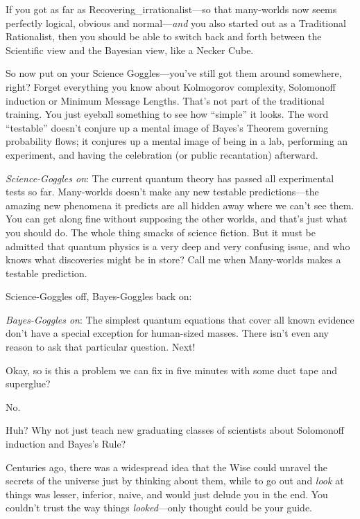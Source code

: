 {
 If you got as far as Recovering\_irrationalist---so that
many-worlds now seems perfectly logical, obvious and
normal---\textit{and} you also started out as a Traditional
Rationalist, then you should be able to switch back and forth between
the Scientific view and the Bayesian view, like a Necker Cube.}

{
 So now put on your Science Goggles---you've still
got them around somewhere, right? Forget everything you know about
Kolmogorov complexity, Solomonoff induction or Minimum Message Lengths.
That's not part of the traditional training. You just
eyeball something to see how
``simple'' it looks. The word
``testable'' doesn't
conjure up a mental image of Bayes's Theorem governing
probability flows; it conjures up a mental image of being in a lab,
performing an experiment, and having the celebration (or public
recantation) afterward.}

{
 \textit{Science-Goggles on}: The current quantum theory has passed
all experimental tests so far. Many-worlds doesn't make
any new testable predictions---the amazing new phenomena it predicts
are all hidden away where we can't see them. You can
get along fine without supposing the other worlds, and
that's just what you should do. The whole thing smacks
of science fiction. But it must be admitted that quantum physics is a
very deep and very confusing issue, and who knows what discoveries
might be in store? Call me when Many-worlds makes a testable
prediction.}

{
 Science-Goggles off, Bayes-Goggles back on:}

{
 \textit{Bayes-Goggles on}: The simplest quantum equations that
cover all known evidence don't have a special exception
for human-sized masses. There isn't even any reason to
ask that particular question. Next!}

{
 Okay, so is this a problem we can fix in five minutes with some
duct tape and superglue?}

{
 No.}

{
 Huh? Why not just teach new graduating classes of scientists about
Solomonoff induction and Bayes's Rule?}

{
 Centuries ago, there was a widespread idea that the Wise could
unravel the secrets of the universe just by thinking about them, while
to go out and \textit{look} at things was lesser, inferior, naive, and
would just delude you in the end. You couldn't trust
the way things \textit{looked}{}---only thought could be your guide.}

